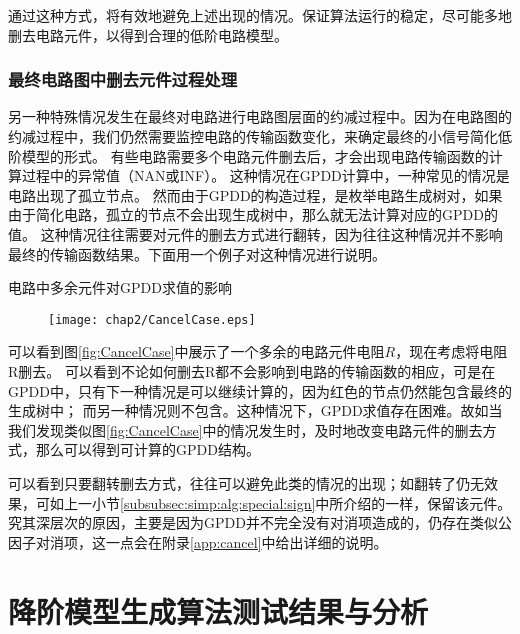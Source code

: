 通过这种方式，将有效地避免上述出现的情况。保证算法运行的稳定，尽可能多地删去电路元件，以得到合理的低阶电路模型。

\subsubsection{最终电路图中删去元件过程处理}
\label{subsubsec:simp:alg:special:reduce}

另一种特殊情况发生在最终对电路进行电路图层面的约减过程中。因为在电路图的约减过程中，我们仍然需要监控电路的传输函数变化，来确定最终的小信号简化低阶模型的形式。
有些电路需要多个电路元件删去后，才会出现电路传输函数的计算过程中的异常值（NAN或INF）。
这种情况在GPDD计算中，一种常见的情况是电路出现了孤立节点。
然而由于GPDD的构造过程，是枚举电路生成树对，如果由于简化电路，孤立的节点不会出现生成树中，那么就无法计算对应的GPDD的值。
这种情况往往需要对元件的删去方式进行翻转，因为往往这种情况并不影响最终的传输函数结果。下面用一个例子对这种情况进行说明。

\begin{exmp}
电路中多余元件对GPDD求值的影响
	
\begin{figure}[!htp]
	\centering
	\texttt{[image: chap2/CancelCase.eps]}
\end{figure}

可以看到图\ref{fig:CancelCase}中展示了一个多余的电路元件电阻$R$，现在考虑将电阻R删去。
可以看到不论如何删去R都不会影响到电路的传输函数的相应，可是在GPDD中，只有下一种情况是可以继续计算的，因为红色的节点仍然能包含最终的生成树中；
而另一种情况则不包含。这种情况下，GPDD求值存在困难。故如当我们发现类似图\ref{fig:CancelCase}中的情况发生时，及时地改变电路元件的删去方式，那么可以得到可计算的GPDD结构。

\end{exmp}

可以看到只要翻转删去方式，往往可以避免此类的情况的出现；如翻转了仍无效果，可如上一小节\ref{subsubsec:simp:alg:special:sign}中所介绍的一样，保留该元件。
究其深层次的原因，主要是因为GPDD并不完全没有对消项造成的，仍存在类似公因子对消项，这一点会在附录\ref{app:cancel}中给出详细的说明。

\section{降阶模型生成算法测试结果与分析}
\label{sec:simp:res}

